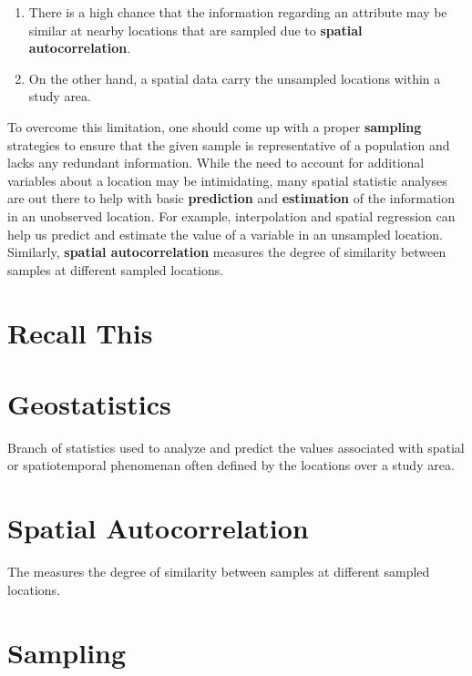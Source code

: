 \documentclass[
]{book}
\begin{document}
\begin{enumerate}
\def\labelenumi{\arabic{enumi}.}
\item
  There is a high chance that the information regarding an attribute may be similar at nearby locations that are sampled due to \textbf{spatial autocorrelation}.
\item
  On the other hand, a spatial data carry the unsampled locations within a study area.
\end{enumerate}

To overcome this limitation, one should come up with a proper \textbf{sampling} strategies to ensure that the given sample is representative of a population and lacks any redundant information. While the need to account for additional variables about a location may be intimidating, many spatial statistic analyses are out there to help with basic \textbf{prediction} and \textbf{estimation} of the information in an unobserved location. For example, interpolation and spatial regression can help us predict and estimate the value of a variable in an unsampled location. Similarly, \textbf{spatial autocorrelation} measures the degree of similarity between samples at different sampled locations.

\hypertarget{recall-this}{%
\section*{Recall This}\label{recall-this}}

\hypertarget{geostatistics}{%
\section{Geostatistics}\label{geostatistics}}

Branch of statistics used to analyze and predict the values associated with spatial or spatiotemporal phenomenan often defined by the locations over a study area.

\hypertarget{spatial-autocorrelation}{%
\section{Spatial Autocorrelation}\label{spatial-autocorrelation}}

The measures the degree of similarity between samples at different sampled locations.

\hypertarget{sampling}{%
\section{Sampling}\label{sampling}}
\end{document}
